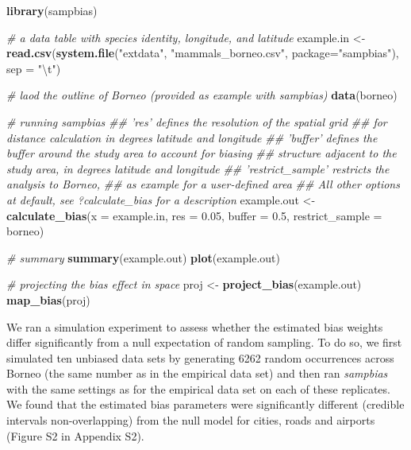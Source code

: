 \documentclass[
  12pt,
]{article}
\newenvironment{Shaded}{\begin{snugshade}}{\end{snugshade}}
\newcommand{\CharTok}[1]{\textcolor[rgb]{0.31,0.60,0.02}{#1}}
\newcommand{\CommentTok}[1]{\textcolor[rgb]{0.56,0.35,0.01}{\textit{#1}}}
\newcommand{\DataTypeTok}[1]{\textcolor[rgb]{0.13,0.29,0.53}{#1}}
\newcommand{\FloatTok}[1]{\textcolor[rgb]{0.00,0.00,0.81}{#1}}
\newcommand{\KeywordTok}[1]{\textcolor[rgb]{0.13,0.29,0.53}{\textbf{#1}}}
\newcommand{\NormalTok}[1]{#1}
\newcommand{\StringTok}[1]{\textcolor[rgb]{0.31,0.60,0.02}{#1}}
\begin{document}
\begin{Shaded}
\begin{Highlighting}[]
\KeywordTok{library}\NormalTok{(sampbias)}

\CommentTok{# a data table with species identity, longitude, and latitude}
\NormalTok{example.in <-}\StringTok{ }\KeywordTok{read.csv}\NormalTok{(}\KeywordTok{system.file}\NormalTok{(}\StringTok{"extdata"}\NormalTok{, }
                                   \StringTok{"mammals_borneo.csv"}\NormalTok{,}
                                   \DataTypeTok{package=}\StringTok{"sampbias"}\NormalTok{), }
                       \DataTypeTok{sep =} \StringTok{"}\CharTok{\textbackslash{}t}\StringTok{"}\NormalTok{)}

\CommentTok{# laod the outline of Borneo (provided as example with sampbias)}
\KeywordTok{data}\NormalTok{(borneo)}

\CommentTok{# running sampbias}
\CommentTok{## 'res' defines the resolution of the spatial grid}
\CommentTok{## for distance calculation in degrees latitude and longitude}
\CommentTok{## 'buffer' defines the buffer around the study area to account for biasing}
\CommentTok{## structure adjacent to the study area, in degrees latitude and longitude}
\CommentTok{## 'restrict_sample' restricts the analysis to Borneo, }
\CommentTok{## as example for a user-defined area }
\CommentTok{## All other options at default, see ?calculate_bias for a description}
\NormalTok{example.out <-}\StringTok{ }\KeywordTok{calculate_bias}\NormalTok{(}\DataTypeTok{x =}\NormalTok{ example.in, }
                              \DataTypeTok{res =} \FloatTok{0.05}\NormalTok{,}
                              \DataTypeTok{buffer =} \FloatTok{0.5}\NormalTok{,}
                              \DataTypeTok{restrict_sample =}\NormalTok{ borneo)}

\CommentTok{# summary}
\KeywordTok{summary}\NormalTok{(example.out)}
\KeywordTok{plot}\NormalTok{(example.out)}

\CommentTok{# projecting the bias effect in space}
\NormalTok{proj <-}\StringTok{ }\KeywordTok{project_bias}\NormalTok{(example.out)}
\KeywordTok{map_bias}\NormalTok{(proj)}
\end{Highlighting}
\end{Shaded}

We ran a simulation experiment to assess whether the estimated bias weights differ significantly from a null expectation of random sampling. To do so, we first simulated ten unbiased data sets by generating 6262 random occurrences across Borneo (the same number as in the empirical data set) and then ran \emph{sampbias} with the same settings as for the empirical data set on each of these replicates. We found that the estimated bias parameters were significantly different (credible intervals non-overlapping) from the null model for cities, roads and airports (Figure S2 in Appendix S2).
\end{document}
